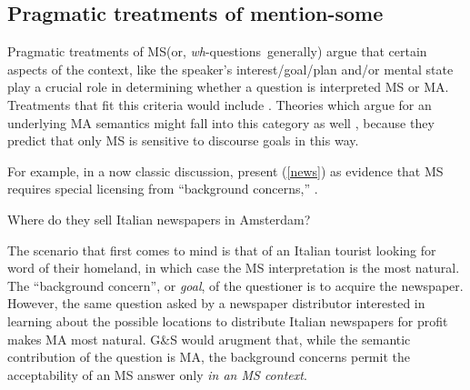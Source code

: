 \documentclass[12pt,letterpaper,table,svgnames,dvipsnames]{article}
\newcommand{\whqs}{\emph{wh}-questions~}
\begin{document}
\subsection{Pragmatic treatments of mention-some}

Pragmatic treatments of MS(or, \whqs generally) argue that certain aspects of the context, like the speaker's interest/goal/plan and/or mental state play a crucial role in determining whether a question is interpreted MS or MA. Treatments that fit this criteria would include \cite{ginzburg1995,asherlascarides1998,vanrooij2003,vanrooij2004}. Theories which argue for an underlying MA semantics might fall into this category as well \cite{karttunen1977,groenstok1982,groenstok1984}, because they predict that only MS is sensitive to discourse goals in this way.

For example, in a now classic discussion, \cite{groenstok1982,groenstok1984} present (\ref{news}) as evidence that MS requires special licensing from ``background concerns,'' \cite[p.543]{groenstok1984}.
\begin{exe}
    \ex Where do they sell Italian newspapers in Amsterdam? \label{news}
\end{exe}
The scenario that first comes to mind is that of an Italian tourist looking for word of their homeland, in which case the MS interpretation is the most natural. The ``background concern'', or \emph{goal}, of the questioner is to acquire the newspaper. However, the same question asked by a newspaper distributor interested in learning about the possible locations to distribute Italian newspapers for profit makes MA most natural. G\&S would arugment that, while the semantic contribution of the question is MA, the background concerns permit the acceptability of an MS answer only \emph{in an MS context}.
\end{document}
